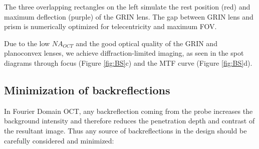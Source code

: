 The three overlapping rectangles on the left simulate the rest position (red) and maximum deflection (purple) of the GRIN lens. The gap between GRIN lens and prism is numerically optimized for telecentricity and maximum FOV.

	Due to the low $\mathit{NA_{OCT}}$ and the good optical quality of the GRIN and planoconvex lenses, we achieve diffraction-limited imaging, as seen in the spot diagrams through focus (Figure \ref{fig:BS}c) and the MTF curve (Figure \ref{fig:BS}d).


\subsection{Minimization of backreflections}
In Fourier Domain OCT, any backreflection coming from the probe increases the background intensity and therefore reduces the penetration depth and contrast of the resultant image. Thus any source of backreflections in the design should be carefully considered and minimized:

